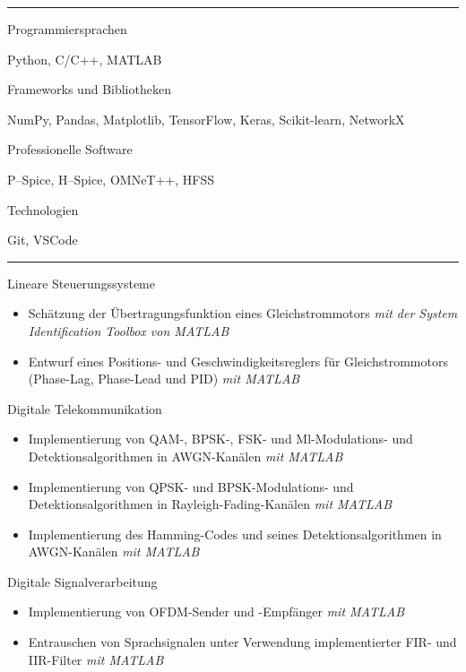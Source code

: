 \documentclass[a4paper,10pt]{article}
\newlength{\cvcolumngapwidth}
\newlength{\cvleftcolumnwidth}
\newlength{\cvrightcolumnwidth}
\newcommand{\cvsectionstyle}[1]{{\normalsize\cvsectionfont\textcolor{cvsectioncolor}{#1}}}
\newcommand{\cvheadingstyle}[1]{{\normalsize\cvheadingfont\textcolor{cvheadingcolor}{#1}}}
\newlength{\cvafteritemskipamount}
\newlength{\cvaftersectionskipamount}
\newlength{\cvbetweensectionandheadingextraskipamount}
\newlength{\cvparskip}
\newcommand{\cvsection}[1]{
    \begin{minipage}[t]{\cvleftcolumnwidth}
        \raggedleft\cvsectionstyle{#1}
    \end{minipage}%
    \hspace{\cvcolumngapwidth}%
    \begin{minipage}[t]{\cvrightcolumnwidth}
        \textcolor{cvrulecolor}{\rule{\cvrightcolumnwidth}{0.3mm}}
    \end{minipage}

    \vspace{\cvaftersectionskipamount}
}
\newcommand{\cvitem}[2]{
    \begin{minipage}[t]{\cvleftcolumnwidth}
        \raggedleft #1
    \end{minipage}%
    \hspace{\cvcolumngapwidth}%
    \begin{minipage}[t]{\cvrightcolumnwidth}
        \setlength{\parskip}{\cvparskip} #2
    \end{minipage}

    \vspace{\cvafteritemskipamount}
}
\begin{document}
\cvsection{TECHNISCHE FÄHIGKEITEN}
\vspace{\cvbetweensectionandheadingextraskipamount}
\cvitem{
    \cvheadingstyle{Programmiersprachen}
}{
    Python, C/C++, MATLAB
}
\vspace{-4mm}
\cvitem{
    \cvheadingstyle{Frameworks und Bibliotheken}
}{
    NumPy, Pandas, Matplotlib, TensorFlow, Keras, Scikit-learn, NetworkX
}
\vspace{-4mm}
\cvitem{
    \cvheadingstyle{Professionelle Software}
}{
    P–Spice, H–Spice, OMNeT++, HFSS
}
\vspace{-4mm}
\cvitem{
    \cvheadingstyle{Technologien}
}{
    Git, VSCode
}


\newpage


\cvsection{KURSPROJEKTE}
\vspace{\cvbetweensectionandheadingextraskipamount}
\cvitem{
    \cvheadingstyle{Lineare Steuerungssysteme}
}{
    \begin{itemize}[leftmargin=*]
        \item Schätzung der Übertragungsfunktion eines Gleichstrommotors \small{\textit{mit der System Identification Toolbox von MATLAB}}
        \item Entwurf eines Positions- und Geschwindigkeitsreglers für Gleichstrommotors (Phase-Lag, Phase-Lead und PID) \small{\textit{mit MATLAB}}
    \end{itemize}
}
\cvitem{
    \cvheadingstyle{Digitale Telekommunikation}
}{
    \begin{itemize}[leftmargin=*]
        \item Implementierung von QAM-, BPSK-, FSK- und Ml-Modulations- und Detektionsalgorithmen in AWGN-Kanälen \small{\textit{mit MATLAB}}
        \item Implementierung von QPSK- und BPSK-Modulations- und Detektionsalgorithmen in Rayleigh-Fading-Kanälen \small{\textit{mit MATLAB}}
        \item Implementierung des Hamming-Codes und seines Detektionsalgorithmen in AWGN-Kanälen \small{\textit{mit MATLAB}}

    \end{itemize}
}
\cvitem{
    \cvheadingstyle{Digitale Signalverarbeitung}
}{
    \begin{itemize}[leftmargin=*]
        \item Implementierung von OFDM-Sender und -Empfänger \small{\textit{mit MATLAB}}
        \item Entrauschen von Sprachsignalen unter Verwendung implementierter FIR- und IIR-Filter \small{\textit{mit MATLAB}}
    \end{itemize}
}
\end{document}
